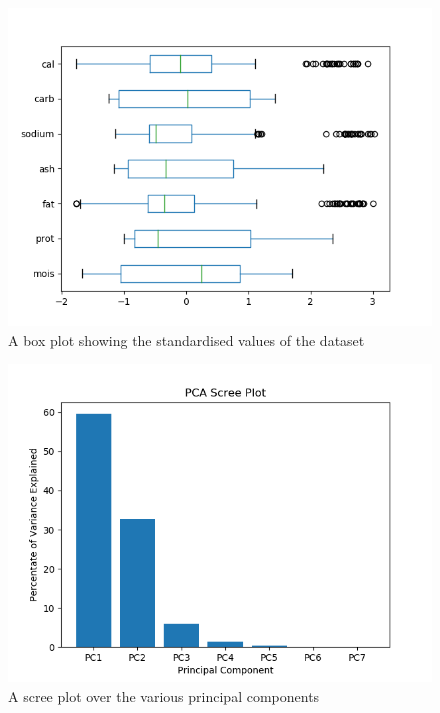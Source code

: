 \documentclass[preprint,12pt]{elsarticle}
\begin{document}
\begin{figure}[hb]
	\centering
    \centerline{\includegraphics[scale=0.6]{figs/scaled_boxplot.png}}
    \caption{A box plot showing the standardised values of the dataset}\label{fig:scaled_boxplot.png}
\end{figure}

\begin{figure}[hb]
	\centering
    \centerline{\includegraphics[scale=0.6]{figs/scree_plot.png}}
    \caption{A scree plot over the various principal components}\label{fig:scree_plot.png}
\end{figure}
\end{document}
